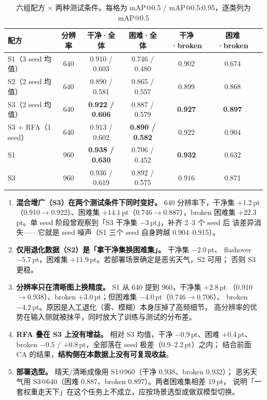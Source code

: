 \documentclass[UTF8,a4paper,11pt]{ctexart}
\begin{document}
\begin{table}[htbp]
\centering
\caption{六组配方 $\times$ 两种测试条件。每格为 mAP@0.5 / mAP@0.5:0.95，逐类列为 mAP@0.5}
\label{tab:matrix}
\setlength{\tabcolsep}{4pt}
\begin{tabular}{lcccccc}
\toprule
配方 & 分辨率 & 干净·全体 & 困难·全体 & 干净·broken & 困难·broken \\
\midrule
S1（3 seed 均值）   & 640 & 0.910 / 0.603 & 0.746 / 0.480 & 0.902 & 0.674 \\
S2（2 seed 均值）   & 640 & 0.890 / 0.581 & 0.865 / 0.557 & 0.899 & 0.868 \\
S3（2 seed 均值）   & 640 & \textbf{0.922 / 0.606} & 0.887 / 0.579 & \textbf{0.927} & \textbf{0.897} \\
S3 + RFA（1 seed）  & 640 & 0.913 / 0.602 & \textbf{0.890 / 0.582} & 0.922 & 0.904 \\
\midrule
S1                  & 960 & \textbf{0.938 / 0.630} & 0.706 / 0.452 & \textbf{0.932} & 0.632 \\
S3                  & 960 & 0.936 / 0.619 & 0.892 / 0.575 & 0.916 & 0.871 \\
\bottomrule
\end{tabular}
\end{table}

\begin{enumerate}[label=(\arabic*)]
  \item \textbf{混合增广（S3）在两个测试条件下同时变好。} 640 分辨率下，干净集 $+1.2$\,pt
        （0.910$\to$0.922）、困难集 $+14.1$\,pt（0.746$\to$0.887），broken 困难集
        $+22.3$\,pt。单 seed 阶段曾观察到「S3 干净集 $-3$\,pt」，补齐 2--3 个 seed 后
        该差异消失——它就是 seed 噪声（S1 三个 seed 自身跨越 0.904--0.915）。
  \item \textbf{仅用退化数据（S2）是「拿干净集换困难集」。} 干净集 $-2.0$\,pt、
        flashover $-5.7$\,pt，困难集 $+11.9$\,pt。若部署场景确定是恶劣天气，S2 可用；
        否则 S3 更稳。
  \item \textbf{分辨率只在清晰图上换精度。} S1 从 640 提到 960，干净集 $+2.8$\,pt
        （0.910$\to$0.938）、broken $+3.0$\,pt；但困难集 $-4.0$\,pt（0.746$\to$0.706）、
        broken $-4.2$\,pt。原因是人工退化（雾、模糊）本身压掉了高频细节，
        高分辨率的优势在输入侧就被抹平，同时放大了训练与测试的分布差。
  \item \textbf{RFA 叠在 S3 上没有增益。} 相对 S3 均值，干净 $-0.9$\,pt、困难 $+0.4$\,pt、
        broken $-0.5$ / $+0.8$\,pt，全部落在 seed 极差（0.9--2.2\,pt）之内；
        结合前面 CA 的结果，\textbf{结构侧在本数据上没有可复现收益}。
  \item \textbf{部署选型。} 晴天/清晰成像用 S1@960（干净 0.938、broken 0.932）；
        恶劣天气用 S3@640（困难 0.887、broken 0.897）。两者困难集相差 19\,pt，
        说明「一套权重走天下」在这个任务上不成立，应按场景选型或做双模型切换。
\end{enumerate}
\end{document}
